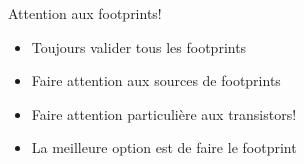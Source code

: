 \begin{frame}{Attention aux footprints!}
    \begin{twocolumns}
        \leftcol
        \begin{itemize}
            \item Toujours valider tous les footprints
            \item Faire attention aux sources de footprints
            \item Faire attention particulière aux transistors!
            \bigskip
            \item La meilleure option est de faire le footprint
        \end{itemize}
        \rightcol
    \end{twocolumns}
\end{frame}

